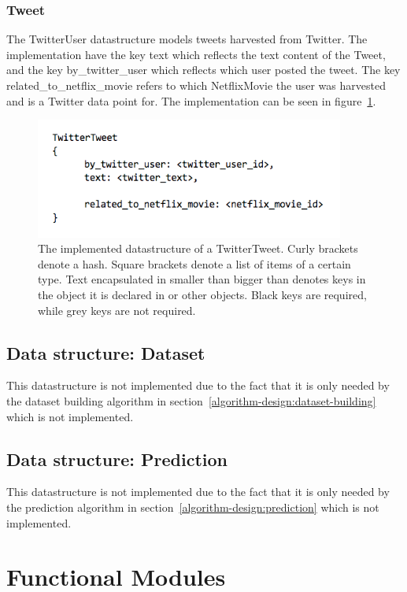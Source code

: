 \subsubsection{Tweet}
The TwitterUser datastructure models tweets harvested from Twitter. The implementation have the key text which reflects the text content of the Tweet, and the key by\_twitter\_user which reflects which user posted the tweet. The key related\_to\_netflix\_movie refers to which NetflixMovie the user was harvested and is a Twitter data point for. The implementation can be seen in figure~\ref{figure:datastructure-twitter-user}.

	\begin{figure}[H]
	\includegraphics[width=4in]{image/datastructure-twitter-tweet.png}
	\centering
	\caption{The implemented datastructure of a TwitterTweet. Curly brackets denote a hash. Square brackets denote a list of items of a certain type. Text encapsulated in smaller than bigger than denotes keys in the object it is declared in or other objects. Black keys are required, while grey keys are not required.}
	\label{figure:datastructure-twitter-user}
	\end{figure}

\subsection{Data structure: Dataset}
This datastructure is not implemented due to the fact that it is only needed by the dataset building algorithm in section~\ref{algorithm-design:dataset-building} which is not implemented.
\subsection{Data structure: Prediction}
This datastructure is not implemented due to the fact that it is only needed by the prediction algorithm in section~\ref{algorithm-design:prediction} which is not implemented.

\section{Functional Modules}\label{impl:Functional Modules}

